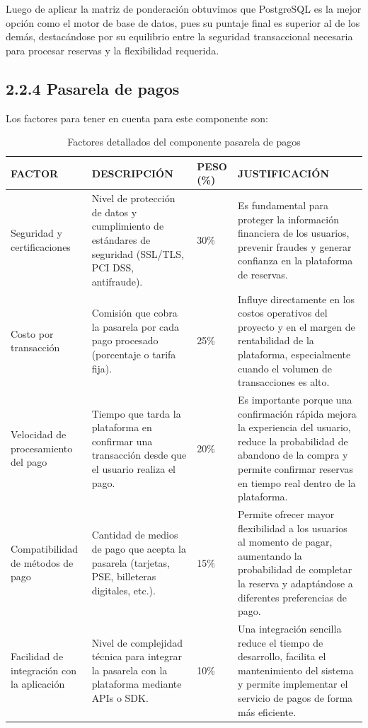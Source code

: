 \documentclass[12pt,a4paper]{article}
\newcommand{\subsectiontitle}[1]{\subsection{#1}}
\begin{document}
Luego de aplicar la matriz de ponderación obtuvimos que PostgreSQL es la mejor opción como el motor de base de datos, pues su puntaje final es superior al de los demás, destacándose por su equilibrio entre la seguridad transaccional necesaria para procesar reservas y la flexibilidad requerida.

\subsectiontitle{2.2.4 Pasarela de pagos}

Los factores para tener en cuenta para este componente son:

\begin{table}[H]
\centering
\begin{tabular}{p{3cm}p{5cm}p{2cm}p{5cm}}
\toprule
\textbf{FACTOR} & \textbf{DESCRIPCIÓN} & \textbf{PESO (\%)} & \textbf{JUSTIFICACIÓN} \\
\midrule
Seguridad y certificaciones & Nivel de protección de datos y cumplimiento de estándares de seguridad (SSL/TLS, PCI DSS, antifraude). & 30\% & Es fundamental para proteger la información financiera de los usuarios, prevenir fraudes y generar confianza en la plataforma de reservas. \\
\addlinespace
Costo por transacción & Comisión que cobra la pasarela por cada pago procesado (porcentaje o tarifa fija). & 25\% & Influye directamente en los costos operativos del proyecto y en el margen de rentabilidad de la plataforma, especialmente cuando el volumen de transacciones es alto. \\
\addlinespace
Velocidad de procesamiento del pago & Tiempo que tarda la plataforma en confirmar una transacción desde que el usuario realiza el pago. & 20\% & Es importante porque una confirmación rápida mejora la experiencia del usuario, reduce la probabilidad de abandono de la compra y permite confirmar reservas en tiempo real dentro de la plataforma. \\
\addlinespace
Compatibilidad de métodos de pago & Cantidad de medios de pago que acepta la pasarela (tarjetas, PSE, billeteras digitales, etc.). & 15\% & Permite ofrecer mayor flexibilidad a los usuarios al momento de pagar, aumentando la probabilidad de completar la reserva y adaptándose a diferentes preferencias de pago. \\
\addlinespace
Facilidad de integración con la aplicación & Nivel de complejidad técnica para integrar la pasarela con la plataforma mediante APIs o SDK. & 10\% & Una integración sencilla reduce el tiempo de desarrollo, facilita el mantenimiento del sistema y permite implementar el servicio de pagos de forma más eficiente. \\
\bottomrule
\end{tabular}
\caption{Factores detallados del componente pasarela de pagos}
\end{table}
\end{document}
